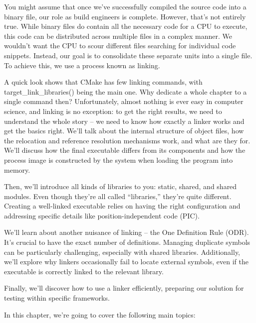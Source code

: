 You might assume that once we’ve successfully compiled the source code into a binary file, our role as build engineers is complete. However, that’s not entirely true. While binary files do contain all the necessary code for a CPU to execute, this code can be distributed across multiple files in a complex manner. We wouldn’t want the CPU to scour different files searching for individual code snippets. Instead, our goal is to consolidate these separate units into a single file. To achieve this, we use a process known as linking.

A quick look shows that CMake has few linking commands, with target\_link\_libraries() being the main one. Why dedicate a whole chapter to a single command then? Unfortunately, almost nothing is ever easy in computer science, and linking is no exception: to get the right results, we need to understand the whole story – we need to know how exactly a linker works and get the basics right. We’ll talk about the internal structure of object files, how the relocation and reference resolution mechanisms work, and what are they for. We’ll discuss how the final executable differs from its components and how the process image is constructed by the system when loading the program into memory.

Then, we’ll introduce all kinds of libraries to you: static, shared, and shared modules. Even though they’re all called “libraries,” they’re quite different. Creating a well-linked executable relies on having the right configuration and addressing specific details like position-independent code (PIC).

We’ll learn about another nuisance of linking – the One Definition Rule (ODR). It’s crucial to have the exact number of definitions. Managing duplicate symbols can be particularly challenging, especially with shared libraries. Additionally, we’ll explore why linkers occasionally fail to locate external symbols, even if the executable is correctly linked to the relevant library.

Finally, we’ll discover how to use a linker efficiently, preparing our solution for testing within specific frameworks.

In this chapter, we’re going to cover the following main topics:

